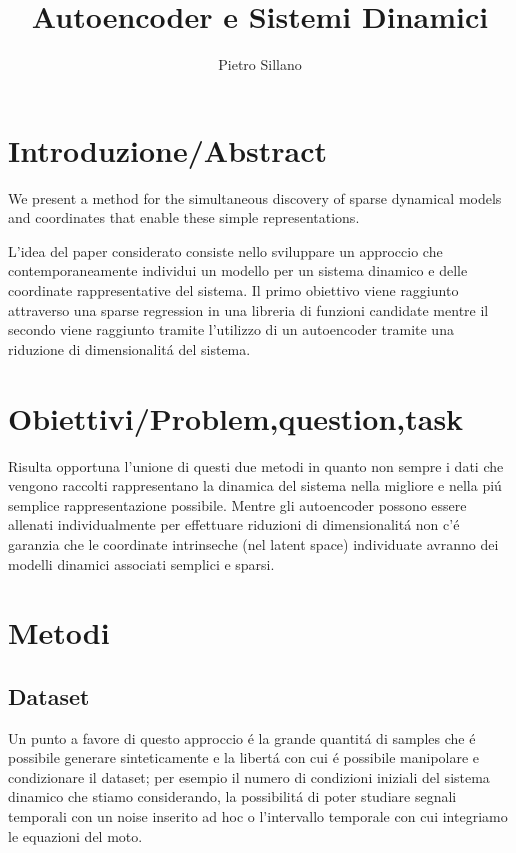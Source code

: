 \documentclass[11pt]{article}
\title{Autoencoder e Sistemi Dinamici}
\author{Pietro Sillano}
\begin{document}
\maketitle
\nocite{1} 
\nocite{2} 



\section{Introduzione/Abstract}
We present a method for the simultaneous discovery of sparse dynamical models and coordinates
that enable these simple representations.



L'idea del paper considerato consiste nello sviluppare un approccio che contemporaneamente individui un modello per un sistema dinamico e delle coordinate rappresentative del sistema.
Il primo obiettivo viene raggiunto attraverso una sparse regression in una libreria di funzioni candidate mentre il secondo viene raggiunto tramite l'utilizzo di un autoencoder tramite una riduzione di dimensionalitá del sistema.
\section{Obiettivi/Problem,question,task}
Risulta opportuna l'unione di questi due metodi in quanto non sempre i dati che vengono raccolti rappresentano la dinamica del sistema nella migliore e nella piú semplice rappresentazione possibile. 
Mentre gli autoencoder possono essere allenati individualmente per effettuare riduzioni di dimensionalitá non c'é garanzia che le coordinate intrinseche (nel latent space) individuate avranno dei modelli dinamici associati semplici e sparsi.


\section{Metodi}

\subsection{Dataset}
Un punto a favore di questo approccio é la grande quantitá di samples che é possibile generare sinteticamente e la libertá con cui é possibile manipolare e condizionare il dataset; per esempio il numero di condizioni iniziali del sistema dinamico che stiamo considerando, la possibilitá di poter studiare segnali temporali con un noise inserito ad hoc o l'intervallo temporale con cui integriamo le equazioni del moto.
\end{document}
